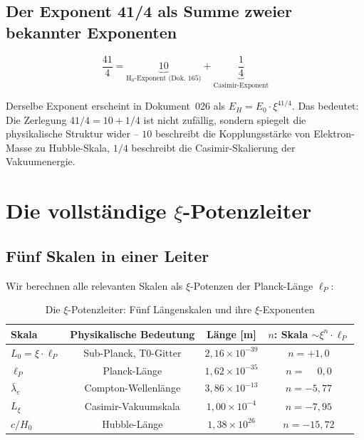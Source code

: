 \subsection{Der Exponent 41/4 als Summe zweier bekannter Exponenten}

\begin{equation}
    \frac{41}{4} = \underbrace{10}_{\text{H}_0\text{-Exponent (Dok.~165)}}
                 + \underbrace{\frac{1}{4}}_{\text{Casimir-Exponent}}
    \label{eq:exponent_decomp}
\end{equation}

Derselbe Exponent erscheint in Dokument~026 als $E_H = E_0 \cdot \xi^{41/4}$.
Das bedeutet: Die Zerlegung $41/4 = 10 + 1/4$ ist nicht zufällig, sondern
spiegelt die physikalische Struktur wider -- $10$ beschreibt die
Kopplungsstärke von Elektron-Masse zu Hubble-Skala, $1/4$ beschreibt
die Casimir-Skalierung der Vakuumenergie.

\section{Die vollständige \texorpdfstring{$\xi$}{xi}-Potenzleiter}
\label{sec:leiter}

\subsection{Fünf Skalen in einer Leiter}

Wir berechnen alle relevanten Skalen als $\xi$-Potenzen der Planck-Länge $\ell_P$:

\begin{table}[H]
    \centering
    \caption{Die $\xi$-Potenzleiter: Fünf Längenskalen und ihre $\xi$-Exponenten}
    \label{tab:scale_ladder}
    \begin{tabular}{lccc}
        \toprule
        \textbf{Skala} & \textbf{Physikalische Bedeutung}
            & \textbf{Länge [m]} & \textbf{$n$: Skala $\sim \xi^n \cdot \ell_P$} \\
        \midrule
        $L_0 = \xi \cdot \ell_P$ & Sub-Planck, T0-Gitter & $2{,}16 \times 10^{-39}$ & $n = +1{,}0$ \\
        $\ell_P$                  & Planck-Länge           & $1{,}62 \times 10^{-35}$ & $n = \phantom{+}0{,}0$ \\
        $\bar\lambda_e$           & Compton-Wellenlänge    & $3{,}86 \times 10^{-13}$ & $n = -5{,}77$ \\
        $L_\xi$                   & Casimir-Vakuumskala    & $1{,}00 \times 10^{-4}$  & $n = -7{,}95$ \\
        $c/H_0$                   & Hubble-Länge           & $1{,}38 \times 10^{26}$  & $n = -15{,}72$ \\
        \bottomrule
    \end{tabular}
\end{table}

